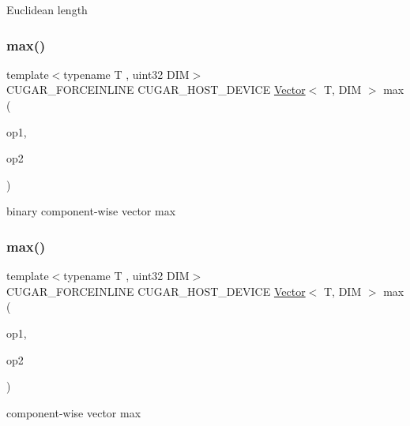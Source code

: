 Euclidean length \mbox{\label{group___vectors_module_ga2aa072c8b0380f4f584c73c56b082c6c}} 
\subsubsection{\texorpdfstring{max()}{max()}\hspace{0.1cm}{\footnotesize\ttfamily [1/2]}}
{\footnotesize\ttfamily template$<$typename T , uint32 D\+IM$>$ \\
C\+U\+G\+A\+R\+\_\+\+F\+O\+R\+C\+E\+I\+N\+L\+I\+NE C\+U\+G\+A\+R\+\_\+\+H\+O\+S\+T\+\_\+\+D\+E\+V\+I\+CE \hyperlink{structcugar_1_1_vector}{Vector}$<$ T, D\+IM $>$ max (\begin{DoxyParamCaption}\item[{const \hyperlink{structcugar_1_1_vector}{Vector}$<$ T, D\+IM $>$ \&}]{op1,  }\item[{const \hyperlink{structcugar_1_1_vector}{Vector}$<$ T, D\+IM $>$ \&}]{op2 }\end{DoxyParamCaption})\hspace{0.3cm}{\ttfamily [related]}}

binary component-\/wise vector max \mbox{\label{group___vectors_module_ga1a6359b28fbccfa3f5bfcea7e6fe4ea2}} 
\subsubsection{\texorpdfstring{max()}{max()}\hspace{0.1cm}{\footnotesize\ttfamily [2/2]}}
{\footnotesize\ttfamily template$<$typename T , uint32 D\+IM$>$ \\
C\+U\+G\+A\+R\+\_\+\+F\+O\+R\+C\+E\+I\+N\+L\+I\+NE C\+U\+G\+A\+R\+\_\+\+H\+O\+S\+T\+\_\+\+D\+E\+V\+I\+CE \hyperlink{structcugar_1_1_vector}{Vector}$<$ T, D\+IM $>$ max (\begin{DoxyParamCaption}\item[{const \hyperlink{structcugar_1_1_vector}{Vector}$<$ T, D\+IM $>$ \&}]{op1,  }\item[{const T}]{op2 }\end{DoxyParamCaption})\hspace{0.3cm}{\ttfamily [related]}}

component-\/wise vector max \mbox{\label{group___vectors_module_ga7f23c3728cf66940e1594ff0e500c980}} 
